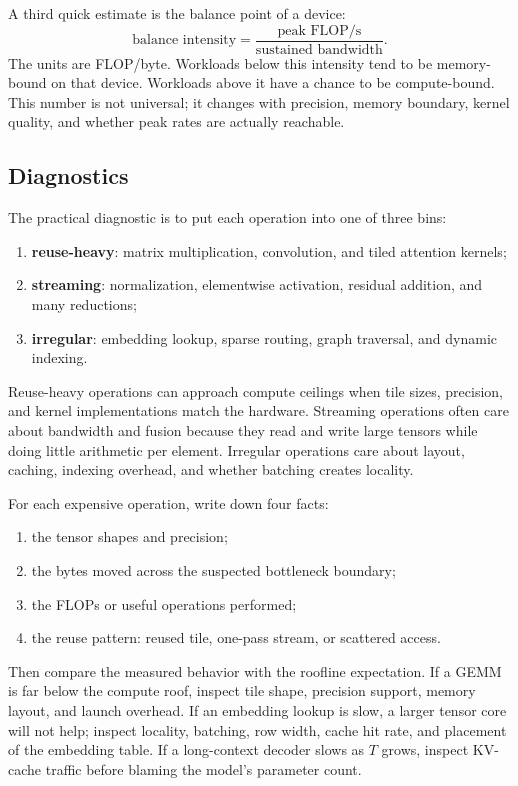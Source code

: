 A third quick estimate is the balance point of a device:
\[
  \text{balance intensity}
  =
  \frac{\text{peak FLOP/s}}{\text{sustained bandwidth}}.
\]
The units are FLOP/byte. Workloads below this intensity tend to be memory-bound on that device. Workloads above it have a chance to be compute-bound. This number is not universal; it changes with precision, memory boundary, kernel quality, and whether peak rates are actually reachable.

\subsection{Diagnostics}

The practical diagnostic is to put each operation into one of three bins:
\begin{enumerate}
  \item \textbf{reuse-heavy}: matrix multiplication, convolution, and tiled attention kernels;
  \item \textbf{streaming}: normalization, elementwise activation, residual addition, and many reductions;
  \item \textbf{irregular}: embedding lookup, sparse routing, graph traversal, and dynamic indexing.
\end{enumerate}

Reuse-heavy operations can approach compute ceilings when tile sizes, precision, and kernel implementations match the hardware. Streaming operations often care about bandwidth and fusion because they read and write large tensors while doing little arithmetic per element. Irregular operations care about layout, caching, indexing overhead, and whether batching creates locality.

For each expensive operation, write down four facts:

\begin{enumerate}[leftmargin=*]
  \item the tensor shapes and precision;
  \item the bytes moved across the suspected bottleneck boundary;
  \item the FLOPs or useful operations performed;
  \item the reuse pattern: reused tile, one-pass stream, or scattered access.
\end{enumerate}

Then compare the measured behavior with the roofline expectation. If a GEMM is far below the compute roof, inspect tile shape, precision support, memory layout, and launch overhead. If an embedding lookup is slow, a larger tensor core will not help; inspect locality, batching, row width, cache hit rate, and placement of the embedding table. If a long-context decoder slows as \(T\) grows, inspect KV-cache traffic before blaming the model's parameter count.

